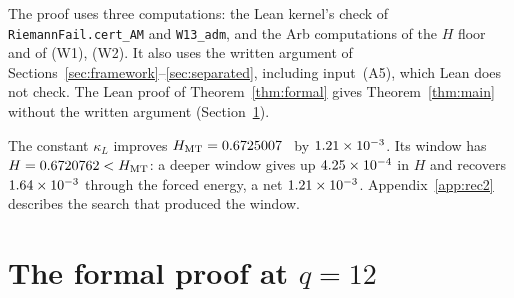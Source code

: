 \documentclass[11pt]{article}
\theoremstyle{definition}
\begin{document}
The proof uses three computations: the Lean kernel's check of
\texttt{RiemannFail.cert\_AM} and \texttt{W13\_adm}, and the Arb computations
of the $H$ floor and of (W1), (W2). It also uses the written argument of
Sections~\ref{sec:framework}--\ref{sec:separated}, including input~(A5),
which Lean does not check. The Lean proof of Theorem~\ref{thm:formal} gives
Theorem~\ref{thm:main} without the written argument
(Section~\ref{sec:q12lean}).

The constant $\kappa_L$ improves $H_{\mathrm{MT}}=0.6725007$~\cite{AF26} by
$1.21\times10^{-3}$. Its window has $H=0.6720762<H_{\mathrm{MT}}$: a deeper window gives
up $4.25\times10^{-4}$ in $H$ and recovers $1.64\times10^{-3}$ through the forced energy, a
net $1.21\times10^{-3}$. Appendix~\ref{app:rec2} describes the search that produced
the window.

\section{The formal proof at \texorpdfstring{$q=12$}{q=12}}\label{sec:q12lean}
\end{document}
